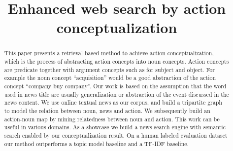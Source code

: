 \documentclass[letterpaper]{article}
\begin{document}
%
\title{Enhanced web search by action conceptualization}

\maketitle
\begin{abstract}
  This paper presents a retrieval based method to achieve action conceptualization,
  which is the process of abstracting action concepts into noun concepts. Action
  concepts are predicate together with argument concepts such as for subject and
  object. For example the noun concept ``acquisition'' would be a good abstraction
  of the action concept ``company buy company''.
  Our work is based on the assumption that the word used in news title are
  usually generalization or abstraction of the event discussed in the news content.
  We use online textual news as our corpus, and build a tripartite graph to model
  the relation between noun, news and action. We subsequently build an action-noun map
  by mining relatedness between noun and action. This work can be useful in various
  domains. As a showcase we build a news search engine with semantic search enabled
  by our conceptualization result. On a human labeled evaluation dataset our method
  outperforms a topic model baseline and a TF-IDF baseline.
\end{abstract}









\nocite{*}


\end{document}
